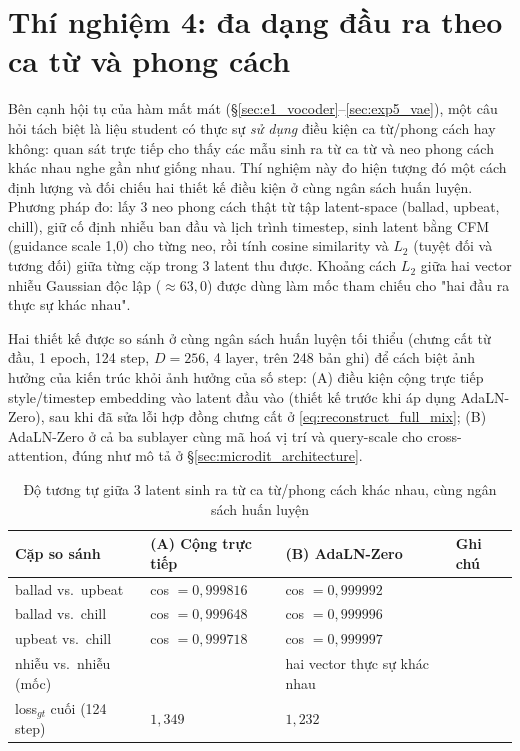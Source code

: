 \documentclass[a4paper,13pt,oneside]{report}
\begin{document}
\section{Thí nghiệm 4: đa dạng đầu ra theo ca từ và phong cách}
\label{sec:exp_diversity}

Bên cạnh hội tụ của hàm mất mát (\S\ref{sec:e1_vocoder}--\ref{sec:exp5_vae}), một câu hỏi
tách biệt là liệu student có thực sự \emph{sử dụng} điều kiện ca từ/phong cách hay không:
quan sát trực tiếp cho thấy các mẫu sinh ra từ ca từ và neo phong cách khác nhau nghe gần
như giống nhau. Thí nghiệm này đo hiện tượng đó một cách định lượng và đối chiếu hai
thiết kế điều kiện ở cùng ngân sách huấn luyện. Phương pháp đo: lấy 3 neo phong cách thật
từ tập latent-space (ballad, upbeat, chill), giữ cố định nhiễu ban đầu và lịch trình
timestep, sinh latent bằng CFM (guidance scale 1,0) cho từng neo, rồi tính cosine
similarity và $L_2$ (tuyệt đối và tương đối) giữa từng cặp trong 3 latent thu được. Khoảng
cách $L_2$ giữa hai vector nhiễu Gaussian độc lập ($\approx63{,}0$) được dùng làm mốc tham
chiếu cho "hai đầu ra thực sự khác nhau".

Hai thiết kế được so sánh ở cùng ngân sách huấn luyện tối thiểu (chưng cất từ đầu, 1 epoch,
124 step, $D=256$, 4 layer, trên 248 bản ghi) để cách biệt ảnh hưởng của kiến trúc khỏi ảnh
hưởng của số step: (A) điều kiện cộng trực tiếp style/timestep embedding vào latent đầu vào
(thiết kế trước khi áp dụng AdaLN-Zero), sau khi đã sửa lỗi hợp đồng chưng cất ở
\eqref{eq:reconstruct_full_mix}; (B) AdaLN-Zero ở cả ba sublayer cùng mã hoá vị trí và
query-scale cho cross-attention, đúng như mô tả ở \S\ref{sec:microdit_architecture}.

\begin{table}[H]
\centering
\caption{Độ tương tự giữa 3 latent sinh ra từ ca từ/phong cách khác nhau, cùng ngân sách huấn luyện}
\label{tab:diversity_check}
\small
\begin{tabularx}{\textwidth}{p{3.4cm}>{\centering\arraybackslash}p{2.6cm}>{\centering\arraybackslash}p{2.4cm}X}
\toprule
\textbf{Cặp so sánh} & \textbf{(A) Cộng trực tiếp} & \textbf{(B) AdaLN-Zero} & \textbf{Ghi chú} \\
\midrule
ballad vs.\ upbeat & cos $=0{,}999816$ & cos $=0{,}999992$ & \\
ballad vs.\ chill & cos $=0{,}999648$ & cos $=0{,}999996$ & \\
upbeat vs.\ chill & cos $=0{,}999718$ & cos $=0{,}999997$ & \\
nhiễu vs.\ nhiễu (mốc) & \multicolumn{2}{c}{$L_2\approx63{,}0$} & hai vector thực sự khác nhau \\
loss$_{gt}$ cuối (124 step) & $1{,}349$ & $1{,}232$ & \\
\bottomrule
\end{tabularx}
\end{table}
\end{document}
